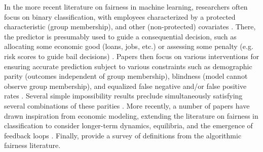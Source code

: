 In the more recent literature on fairness in machine learning,
researchers often focus on binary classification, 
with employees characterized by a protected characteristic (group membership),
and other (non-protected) covariates \citep{pedreshi2008discrimination, kamiran2010discrimination, kamishima2011fairness}.
There, the predictor is presumably used 
to guide a consequential decision,
such as allocating some economic good (loans, jobs, etc.) \citep{corbett2018measure}
or assessing some penalty (e.g. risk scores to guide bail decisions) \citep{chouldechova2017fair}.
Papers then focus on various interventions 
for ensuring accurate prediction subject to various constraints 
such as demographic parity (outcomes independent of group membership), 
blindness (model cannot observe group membership), 
and equalized false negative and/or false positive rates \cite{hardt2016equality}. 
Several simple impossibility results 
preclude simultaneously satisfying 
several combinations of these parities 
\cite{berk2017fairness, chouldechova2017fair, kleinberg2016inherent}.
More recently, a number of papers 
have drawn inspiration from economic modeling, 
extending the literature on fairness in classification 
to consider longer-term dynamics, equilibria, 
and the emergence of feedback loops 
\cite{hu2018short, hardt2016equality, ensign2017runaway}. 
Finally, \cite{Verma2018} provide a survey of definitions 
from the algorithmic fairness literature.
